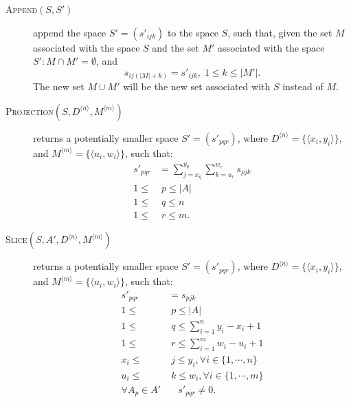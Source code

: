 \documentclass{article}
\begin{document}
\begin{description}
	\item[\textsc{Append}$(S,S')$] append the space
	$S'=\left(s'_{ijk}\right)$ to the space $S$,
		such that, given the set $M$ associated with the space $S$ and
		the set $M'$ associated with the space $S':
		M \cap M' = \emptyset$, and
		\[
			s_{ij(|M|+k)} = s'_{ijk}, \; 1 \leq k \leq |M'|.
		\]
		The new set $M \cup M'$ will be the new set associated with $S$
		instead of $M$.

	\item[\textsc{Projection}$(S, D^{\langle n \rangle}, M^{\langle m \rangle})$] 
		returns a potentially smaller space $S'=\left(s'_{pqr}\right)$,
		where $D^{\langle n \rangle} = \{\langle x_i, y_i \rangle\}$, and
		$M^{\langle m \rangle} = \{\langle u_i, w_i \rangle\}$,
		such that:
		\begin{align*}
			s'_{pqr} &= \sum_{j=x_q}^{y_q}{\sum_{k=u_r}^{w_r}{s_{pjk}}} \\ 
			1 \leq & \; p \leq |A| \\
			1 \leq & \; q \leq n \\
			1 \leq & \; r \leq m.
		\end{align*}

	\item[\textsc{Slice}$(S, A', D^{\langle n \rangle}, M^{\langle m \rangle})$] 
		returns a potentially smaller space $S'=\left(s'_{pqr}\right)$, 
		where $D^{\langle n \rangle} = \{\langle x_i, y_i \rangle\}$, and
		$M^{\langle m \rangle} = \{\langle u_i, w_i \rangle\}$,
		such that:
		\begin{align*}
			s'_{pqr} & = s_{pjk} \\
			1 \leq & \; p \leq |A| \\
			1 \leq & \; q \leq \sum_{i=1}^{n}{y_i-x_i+1} \\
			1 \leq & \; r \leq \sum_{i=1}^{m}{w_i-u_i+1} \\
			x_i \leq & \; j \leq y_i, \forall i \in \{1,\cdots,n\} \\
			u_i \leq & \; k \leq w_i, \forall i \in \{1,\cdots,m\} \\
			\forall A_{p} \in A' & \quad s'_{pqr} \neq 0.
		\end{align*}

\end{description}
\end{document}

